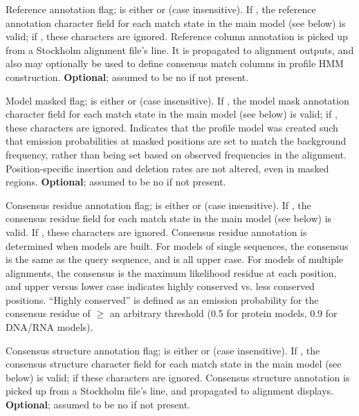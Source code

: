\begin{sreitems}{}
\item [\monob{RF <s>}] Reference annotation flag;  is
either  or  (case insensitive). If , the
reference annotation character field for each match state in the main
model (see below) is valid; if , these characters are
ignored.  Reference column annotation is picked up from a Stockholm
alignment file's  line. It is propagated to alignment
outputs, and also may optionally be used to define consensus match
columns in profile HMM construction. \textbf{Optional}; assumed to be
no if not present.

\item [\monob{MM <s>}] Model masked flag;  is
either  or  (case insensitive). If , the
model mask annotation character field for each match state in the main
model (see below) is valid; if , these characters are
ignored. Indicates that the profile model was created such that
emission probabilities at masked positions are set to match the 
background frequency, rather than being set based on observed frequencies 
in the alignment. Position-specific insertion and deletion rates are not 
altered, even in masked regions. \textbf{Optional}; assumed to be
no if not present.

\item [\monob{CONS <s>}] Consensus residue annotation flag; 
  is either  or  (case insensitive).  If
  , the consensus residue field for each match state in the
  main model (see below) is valid. If , these characters are
  ignored. Consensus residue annotation is determined when models are
  built. For models of single sequences, the consensus is the same as
  the query sequence, and is all upper case. For models of multiple
  alignments, the consensus is the maximum likelihood residue at each
  position, and upper versus lower case indicates highly conserved
  vs. less conserved positions.  ``Highly conserved'' is defined as an
  emission probability for the consensus residue of $\geq$ an
  arbitrary threshold (0.5 for protein models, 0.9 for DNA/RNA
  models).

\item [\monob{CS <s>}] Consensus structure annotation flag;
 is either  or  (case insensitive). If
, the consensus structure character field for each match
state in the main model (see below) is valid; if  these
characters are ignored. Consensus structure annotation is picked up
from a Stockholm file's  line, and propagated to
alignment displays.  \textbf{Optional}; assumed to be no if not
present.


\end{sreitems}
